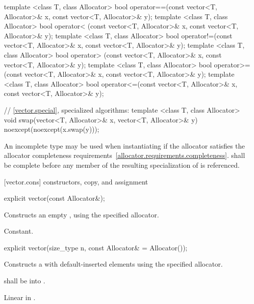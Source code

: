\begin{codeblock}
{  template <class T, class Allocator>
    bool operator==(const vector<T, Allocator>& x, const vector<T, Allocator>& y);
  template <class T, class Allocator>
    bool operator< (const vector<T, Allocator>& x, const vector<T, Allocator>& y);
  template <class T, class Allocator>
    bool operator!=(const vector<T, Allocator>& x, const vector<T, Allocator>& y);
  template <class T, class Allocator>
    bool operator> (const vector<T, Allocator>& x, const vector<T, Allocator>& y);
  template <class T, class Allocator>
    bool operator>=(const vector<T, Allocator>& x, const vector<T, Allocator>& y);
  template <class T, class Allocator>
    bool operator<=(const vector<T, Allocator>& x, const vector<T, Allocator>& y);

  // \ref{vector.special}, specialized algorithms:
  template <class T, class Allocator>
    void swap(vector<T, Allocator>& x, vector<T, Allocator>& y)
      noexcept(noexcept(x.swap(y)));
}
\end{codeblock}%
%

\pnum
An incomplete type  may be used when instantiating 
if the allocator satisfies the
allocator completeness requirements~\ref{allocator.requirements.completeness}.
 shall be complete before any member of the resulting specialization
of  is referenced.

[vector.cons]{ constructors, copy, and assignment}

\begin{itemdecl}
explicit vector(const Allocator&);
\end{itemdecl}

\begin{itemdescr}
\pnum
\effects Constructs an empty , using the
specified allocator.

\pnum
\complexity Constant.
\end{itemdescr}

\begin{itemdecl}
explicit vector(size_type n, const Allocator& = Allocator());
\end{itemdecl}

\begin{itemdescr}
\pnum
\effects Constructs a  with 
default-inserted elements using the specified allocator.

\pnum
\requires {} shall be  into .

\pnum
\complexity Linear in .
\end{itemdescr}

